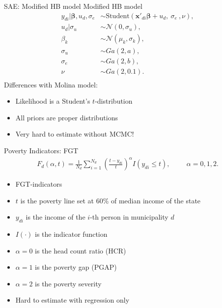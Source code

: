 \begin{frame}{SAE: Modified HB model}
    Modified HB model \cite{morelli_hierarchical_2021}
    \begin{equation*}
        \begin{split}
            y_{di} |\boldsymbol \beta, u_d, \sigma_e & \sim
            \text{Student}(\boldsymbol{x'}_{di} \boldsymbol \beta + u_d,\ \sigma_e\ , \nu), \\
            u_d | \sigma_u & \sim \mathcal N(0, \sigma_u),\  \\
            \beta_k & \sim \mathcal N(\mu_k, \sigma_k),\\
            \sigma_u & \sim Ga(2, a), \\
            \sigma_e & \sim Ga(2, b), \\
            \nu & \sim Ga(2, 0.1). \\
        \end{split}
        \label{eq:mod_hb}
    \end{equation*}
    Differences with Molina model:
    \begin{itemize}
        \item Likelihood is a Student's $t$-distribution
        \item All priors are proper distributions
        \item Very hard to estimate without MCMC!
    \end{itemize}
\end{frame}

\begin{frame}{Poverty Indicators: FGT}
    \vspace{-2cm}
    \begin{gather*}
        F_d(\alpha, t) = \displaystyle \frac 1 {N_d} \sum_{i=1}^{N_d}\left( \frac{t - y_{di}}{t} \right)^\alpha I (y_{di} \le t),
        \hspace{1cm}\alpha = 0, 1, 2.
    \end{gather*}

    \begin{itemize}
        \item FGT-indicators \cite{foster_class_1984}
        \item $t$ is the poverty line set at 60\% of median income of the state
        \item $y_{di}$ is the income of the $i$-th person in municipality $d$
        \item $I(\cdot)$ is the indicator function
        \item $\alpha = 0$ is the head count ratio (HCR)
        \item $\alpha = 1$ is the poverty gap (PGAP)
        \item $\alpha = 2$ is the poverty severity
        \item Hard to estimate with regression only
    \end{itemize}
\end{frame}


